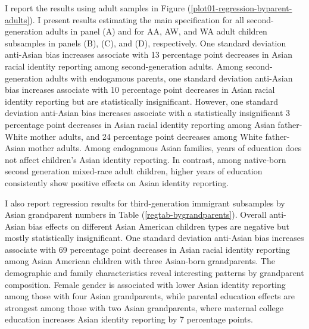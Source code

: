 I report the results using adult samples in Figure (\ref{plot01-regression-byparent-adults}). I present results estimating the main specification for all second-generation adults in panel (A) and for AA, AW, and WA adult children subsamples in panels (B), (C), and (D), respectively. One standard deviation anti-Asian bias increases associate with 13 percentage point decreases in Asian racial identity reporting among second-generation adults. Among second-generation adults with endogamous parents, one standard deviation anti-Asian bias increases associate with 10 percentage point decreases in Asian racial identity reporting but are statistically insignificant. However, one standard deviation anti-Asian bias increases associate with a statistically insignificant 3 percentage point decreases in Asian racial identity reporting among Asian father-White mother adults, and 24 percentage point decreases among White father-Asian mother adults. Among endogamous Asian families, years of education does not affect children's Asian identity reporting. In contrast, among native-born second generation mixed-race adult children, higher years of education consistently show positive effects on Asian identity reporting.

I also report regression results for third-generation immigrant subsamples by Asian grandparent numbers in Table (\ref{regtab-bygrandparents}). Overall anti-Asian bias effects on different Asian American children types are negative but mostly statistically insignificant. One standard deviation anti-Asian bias increases associate with 69 percentage point decreases in Asian racial identity reporting among Asian American children with three Asian-born grandparents. The demographic and family characteristics reveal interesting patterns by grandparent composition. Female gender is associated with lower Asian identity reporting among those with four Asian grandparents, while parental education effects are strongest among those with two Asian grandparents, where maternal college education increases Asian identity reporting by 7 percentage points.

